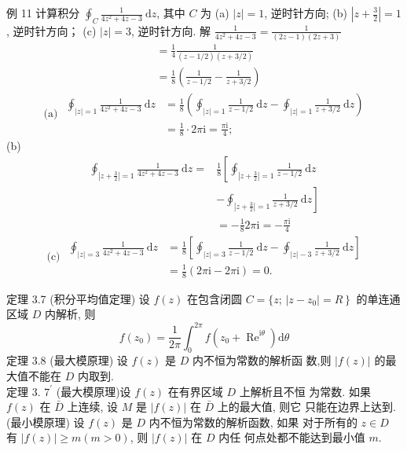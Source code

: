 \documentclass[12pt, a4paper, oneside]{ctexart}
\begin{document}
\begin{center}
    例 11 计算积分 $\oint_C \frac{1}{4 z^2+4 z-3} \mathrm{~d} z$, 其中 $C$ 为
    (a) $|z|=1$, 逆时针方向;
    (b) $\left|z+\frac{3}{2}\right|=1$, 逆时针方向；
    (c) $|z|=3$, 逆时针方向.
    解 $\frac{1}{4 z^2+4 z-3}=\frac{1}{(2 z-1)(2 z+3)}$
    $$
    \begin{aligned}
    & =\frac{1}{4} \frac{1}{(z-1 / 2)(z+3 / 2)} \\
    & =\frac{1}{8}\left(\frac{1}{z-1 / 2}-\frac{1}{z+3 / 2}\right)
    \end{aligned}
    $$
    $$
    \text { (a) } \begin{aligned}
    \oint_{|z|=1} \frac{1}{4 z^2+4 z-3} \mathrm{~d} z & =\frac{1}{8}\left(\oint_{|z|=1} \frac{1}{z-1 / 2} \mathrm{~d} z-\oint_{|z|=1} \frac{1}{z+3 / 2} \mathrm{~d} z\right) \\
    & =\frac{1}{8} \cdot 2 \pi \mathrm{i}=\frac{\pi \mathrm{i}}{4} ;
    \end{aligned}
    $$
    (b)
$$
\begin{aligned}
\oint_{\left|z+\frac{3}{2}\right|=1} \frac{1}{4 z^2+4 z-3} \mathrm{~d} z= & \frac{1}{8}\left[\oint_{\left|z+\frac{3}{2}\right|=1} \frac{1}{z-1 / 2} \mathrm{~d} z\right. \\
& \left.-\oint_{\left|z+\frac{3}{2}\right|=1} \frac{1}{z+3 / 2} \mathrm{~d} z\right] \\
& =-\frac{1}{8} 2 \pi \mathrm{i}=-\frac{\pi \mathrm{i}}{4}
\end{aligned}
$$
$$
\text { (c) } \begin{aligned}
\oint_{|z|=3} \frac{1}{4 z^2+4 z-3} \mathrm{~d} z & =\frac{1}{8}\left[\oint_{|z|=3} \frac{1}{z-1 / 2} \mathrm{~d} z-\oint_{|z|-3} \frac{1}{z+3 / 2} \mathrm{~d} z\right] \\
& =\frac{1}{8}(2 \pi \mathrm{i}-2 \pi \mathrm{i})=0 .
\end{aligned}
$$
\end{center}


定理 3.7 (积分平均值定理) 设 $f(z)$ 在包含闭圆 $C=\{z$; $\left.\left|z-z_0\right|=R\right\}$ 的单连通区域 $D$ 内解析, 则
$$
f\left(z_0\right)=\frac{1}{2 \pi} \int_0^{2 \pi} f\left(z_0+\operatorname{Re}^{\mathrm{i} \theta}\right) \mathrm{d} \theta
$$
定理 3.8 (最大模原理) 设 $f(z)$ 是 $D$ 内不恒为常数的解析函 数,则 $|f(z)|$ 的最大值不能在 $D$ 内取到.\\
定理 3. $7^{\prime}$ (最大模原理)设 $f(z)$ 在有界区域 $D$ 上解析且不恒 为常数. 如果 $f(z)$ 在 $\bar{D}$ 上连续, 设 $M$ 是 $|f(z)|$ 在 $\bar{D}$ 上的最大值, 则它 只能在边界上达到.\\
(最小模原理) 设 $f(z)$ 是 $D$ 内不恒为常数的解析函数, 如果 对于所有的 $z \in D$ 有 $|f(z)| \geqslant m(m>0)$, 则 $|f(z)|$ 在 $D$ 内任 何点处都不能达到最小值 $m$.
\end{document}
